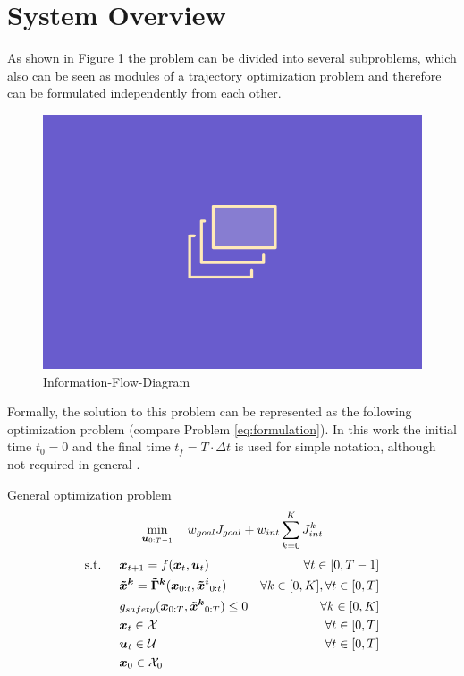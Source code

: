 \section{System Overview}
\label{text:approach/overview}
As shown in Figure \ref{img:information_flow} the problem can be divided into several subproblems, which also can be seen as modules of a trajectory optimization problem and therefore can be formulated independently from each other. 

\begin{figure}[!ht]
\begin{center}
\includegraphics[width=\imgwidth]{images/placeholder.png}
\caption{Information-Flow-Diagram}
\label{img:information_flow}
\end{center}
\end{figure}

Formally, the solution to this problem can be represented as the following optimization problem (compare Problem \ref{eq:formulation}). In this work the initial time $t_0 = 0$ and the final time $t_f = T \cdot \Delta t$ is used for simple notation, although not required in general \cite{Wachter2006}. \\

\begin{problem} General \project optimization problem
\begin{equation}
\min_{\boldsymbol{u}_{0:T-1}} \quad w_{goal} J_{goal} + w_{int} \sum_{k=0}^K J_{int}^k
\end{equation}
\begin{align}
\textrm{s.t. } \quad & \x_{t+1} = \f(\x_t, \u_t) & \forall t \in [0, T - 1] \\
& \xped[k] = \distmodel[k](\x_{0:t}, \xped[i]_{0:t}) & \forall k \in [0, K], \forall t \in [0, T]\\
& g_{safety}(\x_{0:T}, \xped[k]_{0:T}) \leq 0 & \forall k \in [0, K] \\
& \x_t \in \xset & \forall t \in [0, T]\\
& \u_t \in \uset & \forall t \in [0, T]\\
& \x_0 \in \xset_0
\end{align} 
\label{eq:formulation}
\end{problem}

